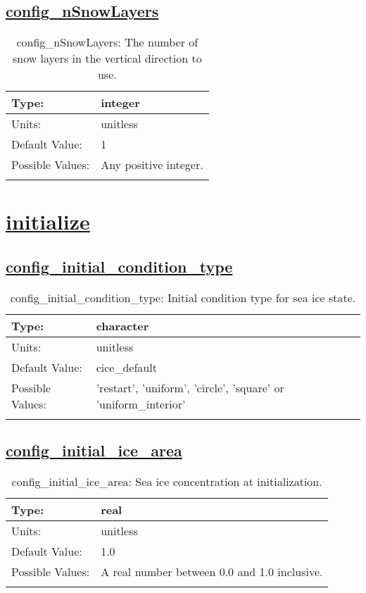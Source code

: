 \subsection[config\_nSnowLayers]{\hyperref[sec:nm_tab_dimensions]{config\_nSnowLayers}}
\label{subsec:nm_sec_config_nSnowLayers}
\begin{center}
\begin{longtable}{| p{2.0in} || p{4.0in} |}
    \hline
    Type: & integer \\
    \hline
    Units: & \si{unitless} \\
    \hline
    Default Value: & 1 \\
    \hline
    Possible Values: & Any positive integer. \\
    \hline
    \caption{config\_nSnowLayers: The number of snow layers in the vertical direction to use.}
\end{longtable}
\end{center}
\section[initialize]{\hyperref[sec:nm_tab_initialize]{initialize}}
\label{sec:nm_sec_initialize}
\subsection[config\_initial\_condition\_type]{\hyperref[sec:nm_tab_initialize]{config\_initial\_condition\_type}}
\label{subsec:nm_sec_config_initial_condition_type}
\begin{center}
\begin{longtable}{| p{2.0in} || p{4.0in} |}
    \hline
    Type: & character \\
    \hline
    Units: & \si{unitless} \\
    \hline
    Default Value: & cice\_default \\
    \hline
    Possible Values: & 'restart', 'uniform', 'circle', 'square' or 'uniform\_interior' \\
    \hline
    \caption{config\_initial\_condition\_type: Initial condition type for sea ice state.}
\end{longtable}
\end{center}
\subsection[config\_initial\_ice\_area]{\hyperref[sec:nm_tab_initialize]{config\_initial\_ice\_area}}
\label{subsec:nm_sec_config_initial_ice_area}
\begin{center}
\begin{longtable}{| p{2.0in} || p{4.0in} |}
    \hline
    Type: & real \\
    \hline
    Units: & \si{unitless} \\
    \hline
    Default Value: & 1.0 \\
    \hline
    Possible Values: & A real number between 0.0 and 1.0 inclusive. \\
    \hline
    \caption{config\_initial\_ice\_area: Sea ice concentration at initialization.}
\end{longtable}
\end{center}
